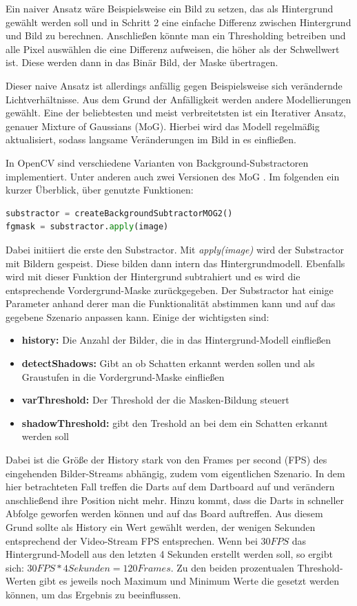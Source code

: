 Ein naiver Ansatz wäre Beispielsweise ein Bild zu setzen, das als Hintergrund gewählt werden soll und in Schritt 2 eine einfache Differenz zwischen Hintergrund und Bild zu berechnen. Anschließen könnte man ein Thresholding betreiben und alle Pixel auswählen die eine Differenz aufweisen, die höher als der Schwellwert ist. \autocite[3]{foreground2003}
Diese werden dann in das Binär Bild, der Maske übertragen. 

Dieser naive Ansatz ist allerdings anfällig gegen Beispielsweise sich verändernde Lichtverhältnisse. Aus dem Grund der Anfälligkeit werden andere Modellierungen gewählt. Eine der beliebtesten und meist verbreitetsten ist ein Iterativer Ansatz, genauer Mixture of Gaussians (MoG). Hierbei wird das Modell regelmäßig aktualisiert, sodass langsame Veränderungen im Bild in es einfließen. \autocite[4]{foreground2003}

In OpenCV sind verschiedene Varianten von Background-Substractoren implementiert. Unter anderen auch zwei Versionen des MoG \autocite{OpenCVBack2016}. Im folgenden ein kurzer Überblick, über genutzte Funktionen:
\begin{lstlisting}[frame=single,language=Python]
substractor = createBackgroundSubtractorMOG2()
fgmask = substractor.apply(image)
\end{lstlisting}
Dabei initiiert die erste den Substractor.
Mit \textit{apply(image)} wird der Substractor mit Bildern gespeist. Diese bilden dann intern das Hintergrundmodell. Ebenfalls wird mit dieser Funktion der Hintergrund subtrahiert und es wird die entsprechende Vordergrund-Maske zurückgegeben. 
Der Substractor hat einige Parameter anhand derer man die Funktionalität abstimmen kann und auf das gegebene Szenario anpassen kann. Einige der wichtigsten sind:
\begin{itemize}
	\item \textbf{history:} Die Anzahl der Bilder, die in das Hintergrund-Modell einfließen
	\item \textbf{detectShadows:} Gibt an ob Schatten erkannt werden sollen und als Graustufen in die Vordergrund-Maske einfließen
	\item \textbf{varThreshold:} Der Threshold der die Masken-Bildung steuert
	\item \textbf{shadowThreshold:} gibt den Treshold an bei dem ein Schatten erkannt werden soll
\end{itemize}
Dabei ist die Größe der History stark von den Frames per second (FPS) des eingehenden Bilder-Streams abhängig, zudem vom eigentlichen Szenario. In dem hier betrachteten Fall treffen die Darts auf dem Dartboard auf und verändern anschließend ihre Position nicht mehr. Hinzu kommt, dass die Darts in schneller Abfolge geworfen werden können und auf das Board auftreffen. Aus diesem Grund sollte als History ein Wert gewählt werden, der wenigen Sekunden entsprechend der Video-Stream FPS entsprechen. Wenn bei $30FPS$ das Hintergrund-Modell aus den letzten 4 Sekunden erstellt werden soll, so ergibt sich: $30FPS * 4 Sekunden = 120 Frames$.
Zu den beiden prozentualen Threshold-Werten gibt es jeweils noch Maximum und Minimum Werte die gesetzt werden können, um das Ergebnis zu beeinflussen.

